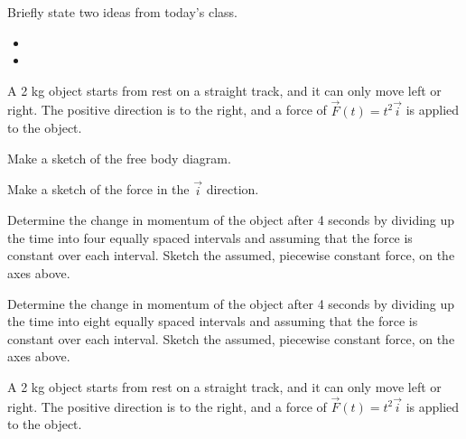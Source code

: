 \postClass

\begin{problem}
\item Briefly state two ideas from today's class.
  \begin{itemize}
  \item 
  \item 
  \end{itemize}
\item A 2 kg object starts from rest on a straight track, and it can
  only move left or right. The positive direction is to the right, and
  a force of $\vec{F}(t)=t^2 \vec{i}$ is applied to the object.

  \begin{subproblem}
    \item Make a sketch of the free body diagram.
      \vspace{4em}
    \item Make a sketch of the force in the $\vec{i}$ direction. \\
      \scalebox{0.5}{}

    \item Determine the change in momentum of the object after 4
      seconds by dividing up the time into four equally spaced
      intervals and assuming that the force is constant over each
      interval. Sketch the assumed, piecewise constant force, on the
      axes above.
      \vfill
    \item Determine the change in momentum of the object after 4
      seconds by dividing up the time into eight equally spaced
      intervals and assuming that the force is constant over each
      interval. Sketch the assumed, piecewise constant force, on the
      axes above.
      \vfill
  \end{subproblem}

  \clearpage

\item A 2 kg object starts from rest on a straight track, and it can
  only move left or right. The positive direction is to the right, and
  a force of $\vec{F}(t)=t^2 \vec{i}$ is applied to the object.


\end{problem}
